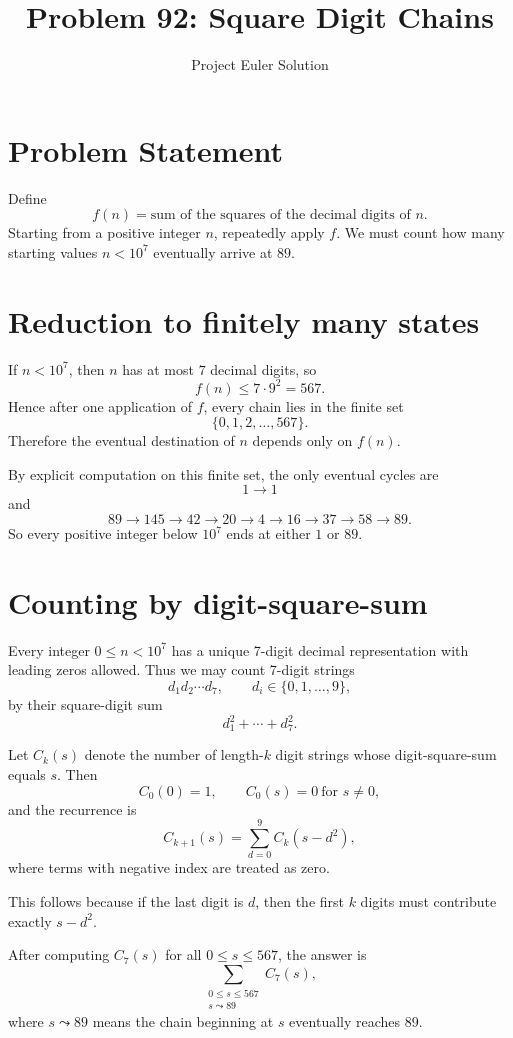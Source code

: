 \documentclass[12pt]{article}
\title{Problem 92: Square Digit Chains}
\author{Project Euler Solution}
\date{}
\begin{document}
\maketitle

\section{Problem Statement}

Define
\[
f(n)=\text{sum of the squares of the decimal digits of }n.
\]
Starting from a positive integer $n$, repeatedly apply $f$. We must count how many starting values $n<10^7$ eventually arrive at $89$.

\section{Reduction to finitely many states}

If $n<10^7$, then $n$ has at most $7$ decimal digits, so
\[
f(n)\le 7\cdot 9^2 = 567.
\]
Hence after one application of $f$, every chain lies in the finite set
\[
\{0,1,2,\dots,567\}.
\]
Therefore the eventual destination of $n$ depends only on $f(n)$.

By explicit computation on this finite set, the only eventual cycles are
\[
1\to 1
\]
and
\[
89\to145\to42\to20\to4\to16\to37\to58\to89.
\]
So every positive integer below $10^7$ ends at either $1$ or $89$.

\section{Counting by digit-square-sum}

Every integer $0\le n<10^7$ has a unique 7-digit decimal representation with leading zeros allowed. Thus we may count 7-digit strings
\[
d_1d_2\cdots d_7,\qquad d_i\in\{0,1,\dots,9\},
\]
by their square-digit sum
\[
d_1^2+\cdots+d_7^2.
\]

Let $C_k(s)$ denote the number of length-$k$ digit strings whose digit-square-sum equals $s$. Then
\[
C_0(0)=1,\qquad C_0(s)=0\ \text{for }s\ne 0,
\]
and the recurrence is
\[
C_{k+1}(s)=\sum_{d=0}^{9} C_k(s-d^2),
\]
where terms with negative index are treated as zero.

This follows because if the last digit is $d$, then the first $k$ digits must contribute exactly $s-d^2$.

After computing $C_7(s)$ for all $0\le s\le 567$, the answer is
\[
\sum_{\substack{0\le s\le 567\\ s\leadsto 89}} C_7(s),
\]
where $s\leadsto 89$ means the chain beginning at $s$ eventually reaches $89$.
\end{document}
